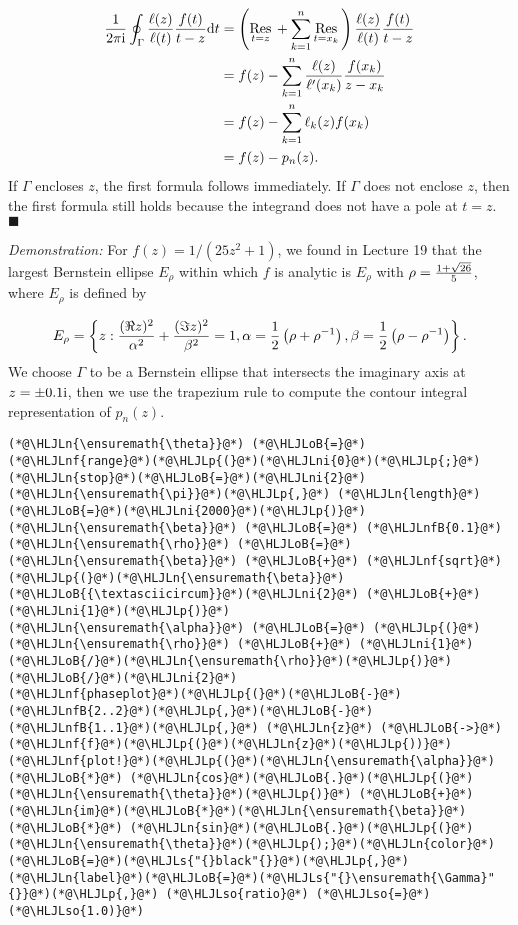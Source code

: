 \documentclass[12pt,a4paper]{article}
\newcommand{\HLJLn}[1]{#1}
\newcommand{\HLJLnf}[1]{\textcolor[RGB]{66,102,213}{#1}}
\newcommand{\HLJLs}[1]{\textcolor[RGB]{201,61,57}{#1}}
\newcommand{\HLJLso}[1]{\textcolor[RGB]{201,61,57}{#1}}
\newcommand{\HLJLnfB}[1]{\textcolor[RGB]{59,151,46}{#1}}
\newcommand{\HLJLni}[1]{\textcolor[RGB]{59,151,46}{#1}}
\newcommand{\HLJLoB}[1]{\textcolor[RGB]{102,102,102}{\textbf{#1}}}
\newcommand{\HLJLp}[1]{#1}
\def\D{ {\rm d} }
\def\I{ {\rm i} }
\def\Res_#1{\underset{#1}{\rm Res}\,}
\def\dt{\D t}
\begin{document}
\begin{align*}
{1 \over 2\pi\I}\oint_{\Gamma} {\ell(z) \over \ell(t)}{f(t) \over t - z}\dt &= \left(\Res_{t = z} + \sum_{k = 1}^{n} \Res_{t = x_k}  \right) {\ell(z) \over \ell(t)}{f(t) \over t - z} \\
& = f(z) - \sum_{k=1}^{n}  {\ell(z) \over \ell'(x_k)}{f(x_k) \over z - x_k} \\
& = f(z) - \sum_{k=1}^{n}   \ell_k(z)f(x_k) \\
& = f(z) - p_n(z).
\end{align*}
If $\Gamma$ encloses $z$, the first formula follows immediately. If $\Gamma$ does not enclose $z$, then the first formula still holds because the integrand does not have a pole at $t = z$. \ensuremath{\blacksquare}

\emph{Demonstration:} For $f(z) = 1/(25z^2 + 1)$, we found in Lecture 19 that the largest Bernstein ellipse $E_{\rho}$ within which $f$ is analytic is $E_{\rho}$ with $\rho = {1 + \sqrt{26}\over 5}$, where $E_{\rho}$ is defined by

\[
E_{\rho} = \left\lbrace z : {(\Re z)^2 \over \alpha^2} + {(\Im z)^2 \over \beta^2} = 1, \alpha = {1 \over 2}\left( \rho + \rho^{-1} \right),   \beta = {1 \over 2}\left( \rho - \rho^{-1} \right) \right\rbrace.
\]
We choose $\Gamma$ to be a Bernstein ellipse that intersects the imaginary axis at $z = \pm 0.1\I$, then we use the trapezium rule to compute the contour integral representation of $p_n(z)$.


\begin{lstlisting}
(*@\HLJLn{\ensuremath{\theta}}@*) (*@\HLJLoB{=}@*) (*@\HLJLnf{range}@*)(*@\HLJLp{(}@*)(*@\HLJLni{0}@*)(*@\HLJLp{;}@*) (*@\HLJLn{stop}@*)(*@\HLJLoB{=}@*)(*@\HLJLni{2}@*)(*@\HLJLn{\ensuremath{\pi}}@*)(*@\HLJLp{,}@*) (*@\HLJLn{length}@*)(*@\HLJLoB{=}@*)(*@\HLJLni{2000}@*)(*@\HLJLp{)}@*)
(*@\HLJLn{\ensuremath{\beta}}@*) (*@\HLJLoB{=}@*) (*@\HLJLnfB{0.1}@*)
(*@\HLJLn{\ensuremath{\rho}}@*) (*@\HLJLoB{=}@*) (*@\HLJLn{\ensuremath{\beta}}@*) (*@\HLJLoB{+}@*) (*@\HLJLnf{sqrt}@*)(*@\HLJLp{(}@*)(*@\HLJLn{\ensuremath{\beta}}@*)(*@\HLJLoB{{\textasciicircum}}@*)(*@\HLJLni{2}@*) (*@\HLJLoB{+}@*) (*@\HLJLni{1}@*)(*@\HLJLp{)}@*)
(*@\HLJLn{\ensuremath{\alpha}}@*) (*@\HLJLoB{=}@*) (*@\HLJLp{(}@*)(*@\HLJLn{\ensuremath{\rho}}@*) (*@\HLJLoB{+}@*) (*@\HLJLni{1}@*)(*@\HLJLoB{/}@*)(*@\HLJLn{\ensuremath{\rho}}@*)(*@\HLJLp{)}@*)(*@\HLJLoB{/}@*)(*@\HLJLni{2}@*)
(*@\HLJLnf{phaseplot}@*)(*@\HLJLp{(}@*)(*@\HLJLoB{-}@*)(*@\HLJLnfB{2..2}@*)(*@\HLJLp{,}@*)(*@\HLJLoB{-}@*)(*@\HLJLnfB{1..1}@*)(*@\HLJLp{,}@*) (*@\HLJLn{z}@*) (*@\HLJLoB{->}@*) (*@\HLJLnf{f}@*)(*@\HLJLp{(}@*)(*@\HLJLn{z}@*)(*@\HLJLp{))}@*)
(*@\HLJLnf{plot!}@*)(*@\HLJLp{(}@*)(*@\HLJLn{\ensuremath{\alpha}}@*) (*@\HLJLoB{*}@*) (*@\HLJLn{cos}@*)(*@\HLJLoB{.}@*)(*@\HLJLp{(}@*)(*@\HLJLn{\ensuremath{\theta}}@*)(*@\HLJLp{)}@*) (*@\HLJLoB{+}@*) (*@\HLJLn{im}@*)(*@\HLJLoB{*}@*)(*@\HLJLn{\ensuremath{\beta}}@*) (*@\HLJLoB{*}@*) (*@\HLJLn{sin}@*)(*@\HLJLoB{.}@*)(*@\HLJLp{(}@*)(*@\HLJLn{\ensuremath{\theta}}@*)(*@\HLJLp{);}@*)(*@\HLJLn{color}@*)(*@\HLJLoB{=}@*)(*@\HLJLs{"{}black"{}}@*)(*@\HLJLp{,}@*) (*@\HLJLn{label}@*)(*@\HLJLoB{=}@*)(*@\HLJLs{"{}\ensuremath{\Gamma}"{}}@*)(*@\HLJLp{,}@*) (*@\HLJLso{ratio}@*) (*@\HLJLso{=}@*) (*@\HLJLso{1.0)}@*)
\end{lstlisting}
\end{document}
